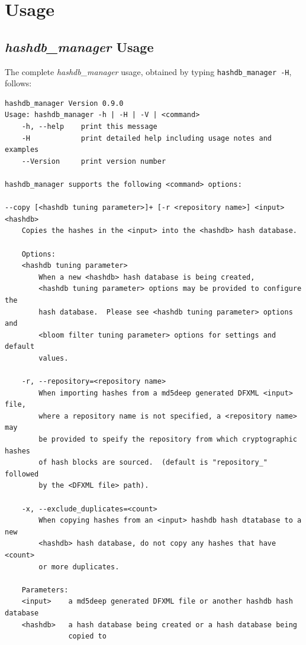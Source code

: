 \documentclass[11pt,twoside]{article}
\newcommand \bulk {\textit{bulk\_extractor}\xspace}
\newcommand \hdb {\textit{hashdb}\xspace}
\newcommand \hdbm {\textit{hashdb\_manager}\xspace}
\newcommand \hdbc {\textit{hashdb\_checker}\xspace}
\newcommand \hid {\textit{hashid}\xspace}
\begin{document}

\appendix
\section{Usage}
\subsection{\hdbm Usage\label{hdbm-usage}}
The complete \hdbm usage,
obtained by typing \texttt{hashdb\_manager -H}, follows:
\begin{small}
\begin{verbatim}
hashdb_manager Version 0.9.0
Usage: hashdb_manager -h | -H | -V | <command>
    -h, --help    print this message
    -H            print detailed help including usage notes and examples
    --Version     print version number

hashdb_manager supports the following <command> options:

--copy [<hashdb tuning parameter>]+ [-r <repository name>] <input> <hashdb>
    Copies the hashes in the <input> into the <hashdb> hash database.

    Options:
    <hashdb tuning parameter>
        When a new <hashdb> hash database is being created,
        <hashdb tuning parameter> options may be provided to configure the
        hash database.  Please see <hashdb tuning parameter> options and
        <bloom filter tuning parameter> options for settings and default
        values.

    -r, --repository=<repository name>
        When importing hashes from a md5deep generated DFXML <input> file,
        where a repository name is not specified, a <repository name> may
        be provided to speify the repository from which cryptographic hashes
        of hash blocks are sourced.  (default is "repository_" followed
        by the <DFXML file> path).

    -x, --exclude_duplicates=<count>
        When copying hashes from an <input> hashdb hash dtatabase to a new
        <hashdb> hash database, do not copy any hashes that have <count>
        or more duplicates.

    Parameters:
    <input>    a md5deep generated DFXML file or another hashdb hash database
    <hashdb>   a hash database being created or a hash database being
               copied to


\end{verbatim}
\end{small}
\end{document}
